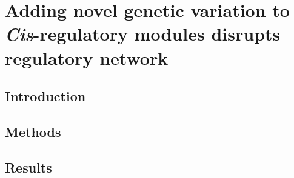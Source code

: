 \documentclass[../main.tex]{subfiles}
\begin{document}
\chapter{Adding novel genetic variation to \textit{Cis}\hyp{}regulatory modules disrupts regulatory network}
\label{chapter6}
\section{Introduction}
\label{chapter6:introduction}
\section{Methods}
\label{chapter6:methods}
\section{Results}
\label{chapter6:results}
\end{document}

